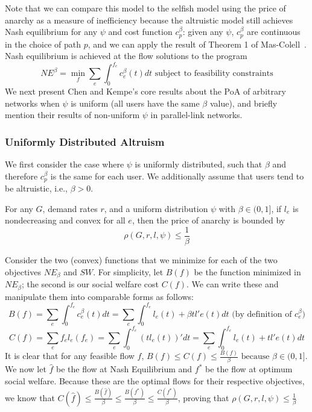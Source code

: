 Note that we can compare this model to the selfish model using the price of anarchy as a measure of inefficiency
because the altruistic model still achieves Nash equilibrium for any $\psi$ and cost function $c^\beta_p$: given any $\psi$, $c^\beta_p$ are continuous in the choice of path $p$, and we can apply the result of Theorem 1 of Mas-Colell~\cite{mascolell}. Nash equilibrium is achieved at the flow solutions to the program
$$NE^\beta = \min_f\sum_e\int_0^{f_e}c_e^\beta(t)dt \text{ subject to feasibility constraints}$$
We next present Chen and Kempe's core results about the PoA of arbitrary networks when $\psi$ is uniform (all users have the same $\beta$ value), and briefly mention their results of non-uniform $\psi$ in parallel-link networks.

\subsubsection{Uniformly Distributed Altruism}
We first consider the case where $\psi$ is uniformly distributed, such that $\beta$ and therefore $c^\beta_p$ is the same for each user. We additionally assume that users tend to be altruistic, i.e., $\beta > 0$.
\begin{theorem}
For any $G$, demand rates $r$, and 
a uniform distribution $\psi$ with $\beta \in (0, 1]$,
if $l_e$ is nondecreasing and convex for all $e$, then the price of anarchy is bounded by 
    $$\rho(G,r,l,\psi) \le \frac{1}{\beta}$$
\end{theorem}

\begin{proof-sketch}
    Consider the two (convex) functions that we minimize for each of the two objectives $NE_\beta$ and $SW$. For simplicity, let $B(f)$ be the function minimized in $NE_\beta$; the second is our social welfare cost $C(f)$.
    We can write these and manipulate them into comparable forms as follows:
    $$B(f) = \sum_e\int_0^{{f}_e}c_e^\beta(t)dt = 
        \sum_e\int_0^{{f}_e} l_e(t) + \beta tl'e(t)dt\text{ (by definition of $c^\beta_e$)}$$
    $$C(f) = \sum_ef_el_e(f_e) = \sum_e\int_0^{f_e} (tl_e(t))' dt 
        = \sum_e\int_0^{f_e} l_e(t) + tl'e(t)dt$$ 
    It is clear that for any feasible flow $f$, 
    $B(f) \le C(f) \le \frac{B(f)}{\beta} \text{ because $\beta\in(0,1]$}$.
    We now let $\hat{f}$ be the flow at Nash Equilibrium and $f^*$ be the flow at optimum social welfare. Because these are the optimal flows for their respective objectives, we know that 
    $C(\hat{f}) \le \frac{B(\hat{f})}{\beta} \le \frac{B(f^*)}{\beta} \le \frac{C(f^*)}{\beta}$,
    proving that 
    $\rho(G,r,l,\psi) \le \frac{1}{\beta}$
\end{proof-sketch}

